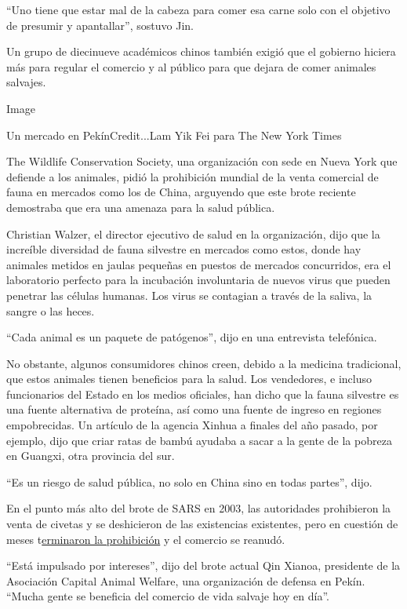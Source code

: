 ``Uno tiene que estar mal de la cabeza para comer esa carne solo con el
objetivo de presumir y apantallar'', sostuvo Jin.

Un grupo de diecinueve académicos chinos también exigió que el gobierno
hiciera más para regular el comercio y al público para que dejara de
comer animales salvajes.

Image

Un mercado en PekínCredit...Lam Yik Fei para The New York Times

The Wildlife Conservation Society, una organización con sede en Nueva
York que defiende a los animales, pidió la prohibición mundial de la
venta comercial de fauna en mercados como los de China, arguyendo que
este brote reciente demostraba que era una amenaza para la salud
pública.

Christian Walzer, el director ejecutivo de salud en la organización,
dijo que la increíble diversidad de fauna silvestre en mercados como
estos, donde hay animales metidos en jaulas pequeñas en puestos de
mercados concurridos, era el laboratorio perfecto para la incubación
involuntaria de nuevos virus que pueden penetrar las células humanas.
Los virus se contagian a través de la saliva, la sangre o las heces.

``Cada animal es un paquete de patógenos'', dijo en una entrevista
telefónica.

No obstante, algunos consumidores chinos creen, debido a la medicina
tradicional, que estos animales tienen beneficios para la salud. Los
vendedores, e incluso funcionarios del Estado en los medios oficiales,
han dicho que la fauna silvestre es una fuente alternativa de proteína,
así como una fuente de ingreso en regiones empobrecidas. Un artículo de
la agencia Xinhua a finales del año pasado, por ejemplo, dijo que criar
ratas de bambú ayudaba a sacar a la gente de la pobreza en Guangxi, otra
provincia del sur.

``Es un riesgo de salud pública, no solo en China sino en todas
partes'', dijo.

En el punto más alto del brote de SARS en 2003, las autoridades
prohibieron la venta de civetas y se deshicieron de las existencias
existentes, pero en cuestión de meses
t\href{https://www.nytimes.com/2004/01/06/world/who-urges-china-to-use-caution-while-killing-civet-cats.html}{erminaron
la prohibición} y el comercio se reanudó.

``Está impulsado por intereses'', dijo del brote actual Qin Xianoa,
presidente de la Asociación Capital Animal Welfare, una organización de
defensa en Pekín. ``Mucha gente se beneficia del comercio de vida
salvaje hoy en día''.

